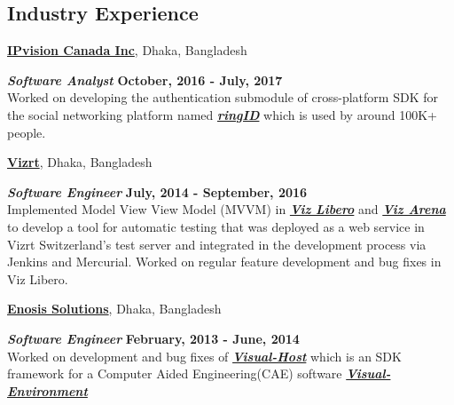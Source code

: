 \documentclass[margin,line]{res}
\begin{document}
\begin{resume}
\section{\sc Industry Experience}
{\bf \href{http://www.ipvision.ca/}{IPvision Canada Inc}}, Dhaka, Bangladesh

\vspace{-.4cm}
\textbf{{\em Software Analyst}} \hfill {\bf October, 2016 - July, 2017}\\
Worked on developing the authentication submodule of cross-platform SDK for the social networking platform named \textbf{\textit{\href{https://www.ringid.com/}{ringID}}} which is used by around 100K+ people.

\vspace{-.2cm}
{\bf \href{http://www.vizrt.com/}{Vizrt}}, Dhaka, Bangladesh

\vspace{-.4cm}
\textbf{{\em Software Engineer}} \hfill {\bf July, 2014 - September, 2016}\\
Implemented Model View View Model (MVVM) in \textbf{\textit{\href{http://www.vizrt.com/products/viz_libero/}{Viz Libero}}} and \textbf{\textit{\href{http://www.vizrt.com/products/viz_arena/}{Viz Arena}}} to develop a tool for automatic testing that was deployed as a web service in Vizrt Switzerland's test server and integrated in the development process via Jenkins and Mercurial.
Worked on regular feature development and bug fixes in Viz Libero.

\vspace{-.2cm}
{\bf \href{http://www.enosisbd.com/}{Enosis Solutions}}, Dhaka, Bangladesh

\vspace{-.4cm}
\textbf{{\em Software Engineer}} \hfill {\bf February, 2013 - June, 2014}\\
Worked on development and bug fixes of \textbf{\textit{\href{http://www.enosisbd.com/downloads/dev_engineering.pdf}{Visual-Host}}} which is an SDK framework for a Computer Aided Engineering(CAE) software \textbf{\textit{\href{https://www.esi-group.com/software-solutions/virtual-integration-platform/multi-domain-simulation/visual-environment}{Visual-Environment}}}

\vspace*{-.1in}


\end{resume}
\end{document}

